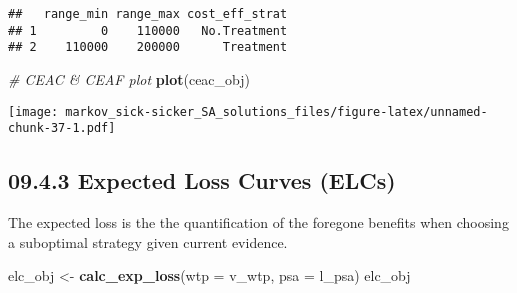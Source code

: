 \documentclass[
]{article}
\newenvironment{Shaded}{\begin{snugshade}}{\end{snugshade}}
\newcommand{\CommentTok}[1]{\textcolor[rgb]{0.56,0.35,0.01}{\textit{#1}}}
\newcommand{\DataTypeTok}[1]{\textcolor[rgb]{0.13,0.29,0.53}{#1}}
\newcommand{\KeywordTok}[1]{\textcolor[rgb]{0.13,0.29,0.53}{\textbf{#1}}}
\newcommand{\NormalTok}[1]{#1}
\newcommand{\StringTok}[1]{\textcolor[rgb]{0.31,0.60,0.02}{#1}}
\begin{document}
\begin{verbatim}
##   range_min range_max cost_eff_strat
## 1         0    110000   No.Treatment
## 2    110000    200000      Treatment
\end{verbatim}

\begin{Shaded}
\begin{Highlighting}[]
\CommentTok{# CEAC & CEAF plot}
\KeywordTok{plot}\NormalTok{(ceac_obj)}
\end{Highlighting}
\end{Shaded}

\texttt{[image: markov\_sick-sicker\_SA\_solutions\_files/figure-latex/unnamed-chunk-37-1.pdf]}

\hypertarget{expected-loss-curves-elcs}{%
\subsection{09.4.3 Expected Loss Curves
(ELCs)}\label{expected-loss-curves-elcs}}

The expected loss is the the quantification of the foregone benefits
when choosing a suboptimal strategy given current evidence.

\begin{Shaded}
\begin{Highlighting}[]
\NormalTok{elc_obj <-}\StringTok{ }\KeywordTok{calc_exp_loss}\NormalTok{(}\DataTypeTok{wtp =}\NormalTok{ v_wtp, }\DataTypeTok{psa =}\NormalTok{ l_psa)}
\NormalTok{elc_obj}
\end{Highlighting}
\end{Shaded}
\end{document}
